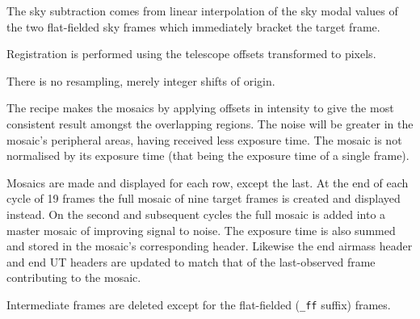 \documentclass[twoside,11pt,nolof]{starlink}
\begin{document}
{{{         \sstitem
         The sky subtraction comes from linear interpolation of the sky
         modal values of the two flat-fielded sky frames which immediately
         bracket the target frame.

         \sstitem
         Registration is performed using the telescope offsets
         transformed to pixels.

         \sstitem
         There is no resampling, merely integer shifts of origin.

         \sstitem
         The recipe makes the mosaics by applying offsets in intensity
         to give the most consistent result amongst the overlapping regions.
         The noise will be greater in the mosaic's peripheral areas, having
         received less exposure time.  The mosaic is not normalised by its
         exposure time (that being the exposure time of a single frame).

         \sstitem
         Mosaics are made and displayed for each row, except the last.
         At the end of each cycle of 19 frames the full mosaic of nine target
         frames is created and displayed instead.  On the second and
         subsequent cycles the full mosaic is added into a master mosaic of
         improving signal to noise.  The exposure time is also summed and
         stored in the mosaic's corresponding header.  Likewise the end
         airmass header and end UT headers are updated to match that of
         the last-observed frame contributing to the mosaic.

         \sstitem
         Intermediate frames are deleted except for the flat-fielded ({\tt\_ff}
         suffix) frames.
      }
   }
   }
\end{document}
